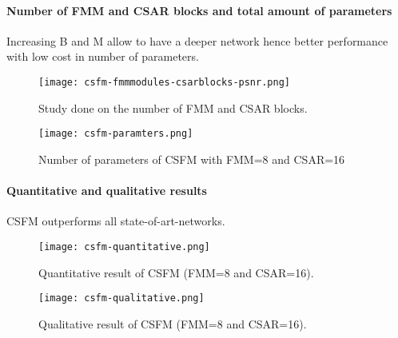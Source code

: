 \paragraph{Number of FMM and CSAR blocks and total amount of parameters}
Increasing B and M allow to have a deeper network hence better performance with low cost in number of parameters.

\begin{figure}[H]
    \centering
    \texttt{[image: csfm-fmmmodules-csarblocks-psnr.png]}
    \caption{Study done on the number of FMM and CSAR blocks.}
\end{figure}
\begin{figure}[H]
    \centering
    \texttt{[image: csfm-paramters.png]}
    \caption{Number of parameters of CSFM with FMM=8 and CSAR=16}
\end{figure}
\paragraph{Quantitative and qualitative results}
CSFM outperforms all state-of-art-networks.

\begin{figure}[H]
    \centering
    \texttt{[image: csfm-quantitative.png]}
    \caption{Quantitative result of CSFM (FMM=8 and CSAR=16).}
\end{figure}

\begin{figure}[H]
    \centering
    \texttt{[image: csfm-qualitative.png]}
    \caption{Qualitative result of CSFM (FMM=8 and CSAR=16).}
\end{figure}